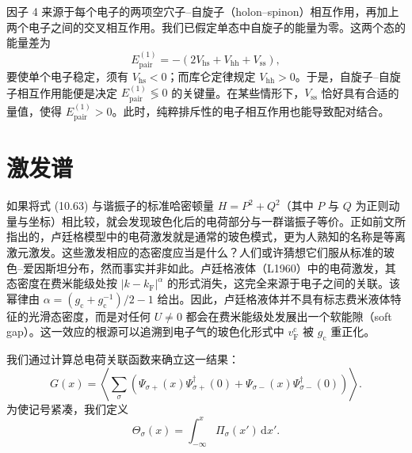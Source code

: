 因子 4 来源于每个电子的两项空穴子–自旋子（holon–spinon）相互作用，再加上两个电子之间的交叉相互作用。我们已假定单态中自旋子的能量为零。这两个态的能量差为
\begin{equation*}
E_{\mathrm{pair}}^{(1)}=-\left(2V_{\mathrm{hs}}+V_{\mathrm{hh}}+V_{\mathrm{ss}}\right),
\tag{10.68}
\end{equation*}
要使单个电子稳定，须有 $V_{\mathrm{hs}}<0$；而库仑定律规定 $V_{\mathrm{hh}}>0$。于是，自旋子–自旋子相互作用能便是决定 $E_{\mathrm{pair}}^{(1)}\lessgtr 0$ 的关键量。在某些情形下，$V_{\mathrm{ss}}$ 恰好具有合适的量值，使得 $E_{\mathrm{pair}}^{(1)}>0$。此时，纯粹排斥性的电子相互作用也能导致配对结合。

\section{激发谱}

如果将式 (10.63) 与谐振子的标准哈密顿量 $H=P^{2}+Q^{2}$（其中 $P$ 与 $Q$ 为正则动量与坐标）相比较，就会发现玻色化后的电荷部分与一群谐振子等价。正如前文所指出的，卢廷格模型中的电荷激发就是通常的玻色模式，更为人熟知的名称是等离激元激发。这些激发相应的态密度应当是什么？人们或许猜想它们服从标准的玻色–爱因斯坦分布，然而事实并非如此。卢廷格液体（L1960）中的电荷激发，其态密度在费米能级处按 $|k-k_{\mathrm{F}}|^{\alpha}$ 的形式消失，这完全来源于电子之间的关联。该幂律由 $\alpha=(g_{\mathrm{c}}+g_{\mathrm{c}}^{-1})/2-1$ 给出。因此，卢廷格液体并不具有标志费米液体特征的光滑态密度，而是对任何 $U\neq0$ 都会在费米能级处发展出一个软能隙（soft gap）。这一效应的根源可以追溯到电子气的玻色化形式中 $v_{\mathrm{F}}^{\mathrm{c}}$ 被 $g_{\mathrm{c}}$ 重正化。

我们通过计算总电荷关联函数来确立这一结果：
\begin{equation*}
G(x)=\left\langle\sum_{\sigma}\left(\Psi_{\sigma+}(x)\Psi_{\sigma+}^{\dagger}(0)+\Psi_{\sigma-}(x)\Psi_{\sigma-}^{\dagger}(0)\right)\right\rangle.
\tag{10.69}
\end{equation*}
为使记号紧凑，我们定义
\begin{equation*}
\Theta_{\sigma}(x)=\int_{-\infty}^{x}\Pi_{\sigma}(x')\,\mathrm{d}x'.
\tag{10.70}
\end{equation*}

